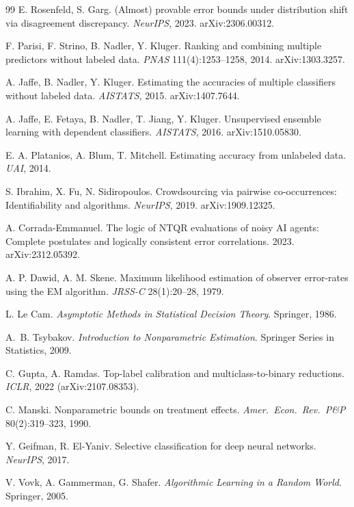 \begin{thebibliography}{99}
 E. Rosenfeld, S. Garg. (Almost) provable error bounds
under distribution shift via disagreement discrepancy. \emph{NeurIPS}, 2023.
arXiv:2306.00312.

 F. Parisi, F. Strino, B. Nadler, Y. Kluger. Ranking and
combining multiple predictors without labeled data. \emph{PNAS} 111(4):1253--1258,
2014. arXiv:1303.3257.

 A. Jaffe, B. Nadler, Y. Kluger. Estimating the accuracies of
multiple classifiers without labeled data. \emph{AISTATS}, 2015. arXiv:1407.7644.

 A. Jaffe, E. Fetaya, B. Nadler, T. Jiang, Y. Kluger.
Unsupervised ensemble learning with dependent classifiers. \emph{AISTATS}, 2016.
arXiv:1510.05830.

 E. A. Platanios, A. Blum, T. Mitchell. Estimating accuracy
from unlabeled data. \emph{UAI}, 2014.

 S. Ibrahim, X. Fu, N. Sidiropoulos. Crowdsourcing via pairwise
co-occurrences: Identifiability and algorithms. \emph{NeurIPS}, 2019.
arXiv:1909.12325.

 A. Corrada-Emmanuel. The logic of NTQR evaluations of
noisy AI agents: Complete postulates and logically consistent error correlations.
2023. arXiv:2312.05392.

 A. P. Dawid, A. M. Skene. Maximum likelihood estimation of
observer error-rates using the EM algorithm. \emph{JRSS-C} 28(1):20--28, 1979.

 L. Le Cam. \emph{Asymptotic Methods in Statistical
Decision Theory}. Springer, 1986.

 A.~B. Tsybakov. \emph{Introduction to Nonparametric
Estimation}. Springer Series in Statistics, 2009.

 C. Gupta, A. Ramdas. Top-label calibration and
multiclass-to-binary reductions. \emph{ICLR}, 2022 (arXiv:2107.08353).

 C. Manski. Nonparametric bounds on treatment effects.
\emph{Amer.\ Econ.\ Rev.\ P\&P} 80(2):319--323, 1990.

 Y. Geifman, R. El-Yaniv. Selective classification for
deep neural networks. \emph{NeurIPS}, 2017.

 V. Vovk, A. Gammerman, G. Shafer. \emph{Algorithmic Learning in a
Random World}. Springer, 2005.


\end{thebibliography}
